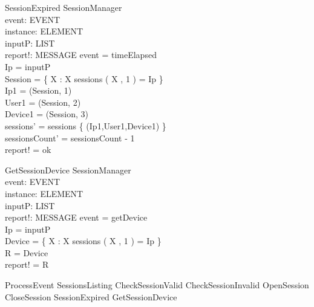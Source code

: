 \begin{schema} {SessionExpired}
\Delta SessionManager \\
event: EVENT \\
instance: ELEMENT \\
inputP: LIST \\
report!: MESSAGE
\where event = timeElapsed \\ 
Ip = \head inputP \\
Session = \{ X : \nat \bbar X \mem sessions \land \nth( X , 1 ) = Ip \} \\
Ip1 = \nth(\head Session, 1) \\
User1 = \nth(\head Session, 2) \\
Device1 = \nth(\head Session, 3) \\
sessions' = sessions \setminus \{ (Ip1,User1,Device1) \} \\
sessionsCount' = sessionsCount - 1 \\ 
report! = ok 
\end{schema}

\begin{schema}{GetSessionDevice}
\Delta SessionManager \\
event: EVENT \\
instance: ELEMENT \\
inputP: LIST \\
report!: MESSAGE
\where event = getDevice \\ 
Ip = \head inputP \\
Device = \{ X : \nat \bbar X \mem sessions \land \nth( X , 1 ) = Ip \} \\
R = Device \\
report! = R 
\end{schema}

\begin{zed} ProcessEvent \sdef SessionsListing
\lor CheckSessionValid
\lor CheckSessionInvalid
\lor OpenSession
\lor CloseSession
\lor SessionExpired
\lor GetSessionDevice
\end{zed}

